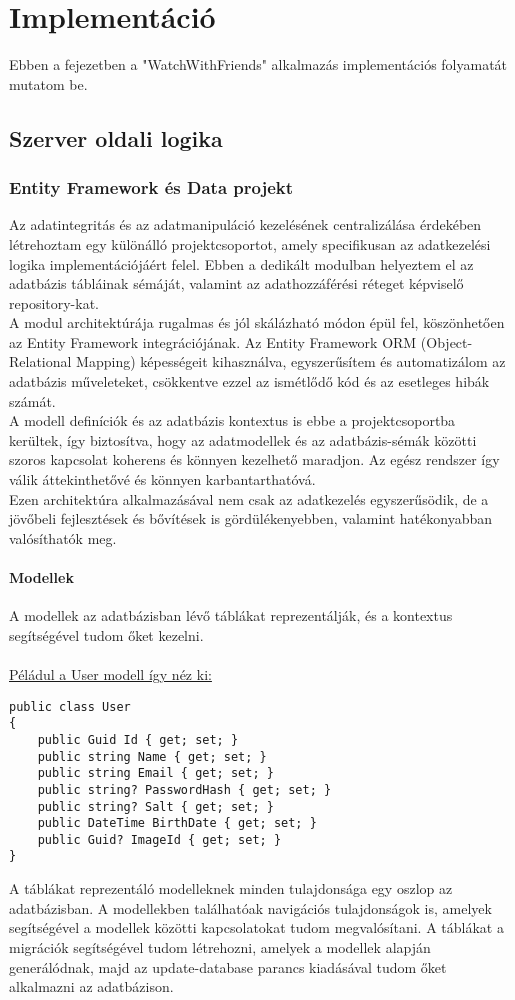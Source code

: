 \chapter{Implement\'aci\'o}\label{chapter:implementation}
Ebben a fejezetben a "WatchWithFriends" alkalmazás implementációs folyamatát mutatom be.
\section*{Szerver oldali logika}
\subsection*{Entity Framework és Data projekt}
Az adatintegritás és az adatmanipuláció kezelésének centralizálása érdekében létrehoztam egy különálló projektcsoportot, amely specifikusan az adatkezelési logika implementációjáért felel. Ebben a dedikált modulban helyeztem el az adatbázis tábláinak sémáját, valamint az adathozzáférési réteget képviselő repository-kat.
\\
A modul architektúrája rugalmas és jól skálázható módon épül fel, köszönhetően az Entity Framework integrációjának. Az Entity Framework ORM (Object-Relational Mapping) képességeit kihasználva, egyszerűsítem és automatizálom az adatbázis műveleteket, csökkentve ezzel az ismétlődő kód és az esetleges hibák számát.
\\
A modell definíciók és az adatbázis kontextus is ebbe a projektcsoportba kerültek, így biztosítva, hogy az adatmodellek és az adatbázis-sémák közötti szoros kapcsolat koherens és könnyen kezelhető maradjon. Az egész rendszer így válik áttekinthetővé és könnyen karbantarthatóvá.
\\
Ezen architektúra alkalmazásával nem csak az adatkezelés egyszerűsödik, de a jövőbeli fejlesztések és bővítések is gördülékenyebben, valamint hatékonyabban valósíthatók meg.
\subsubsection*{Modellek}
A modellek az adatbázisban lévő táblákat reprezentálják, és a kontextus segítségével tudom őket kezelni.
\\
\\
\underline{Péládul a User modell így néz ki:}
\begin{lstlisting}[language=CSharp,style=CSharpBase,caption={User modell}]
public class User
{
    public Guid Id { get; set; }
    public string Name { get; set; }
    public string Email { get; set; }
    public string? PasswordHash { get; set; }
    public string? Salt { get; set; }
    public DateTime BirthDate { get; set; }
    public Guid? ImageId { get; set; }
}
\end{lstlisting}
\vspace{1em}
A táblákat reprezentáló modelleknek minden tulajdonsága egy oszlop az adatbázisban.
A modellekben találhatóak navigációs tulajdonságok is, amelyek segítségével a modellek közötti kapcsolatokat tudom megvalósítani.
A táblákat a migrációk segítségével tudom létrehozni, amelyek a modellek alapján generálódnak, majd az update-database parancs kiadásával tudom őket alkalmazni az adatbázison.

